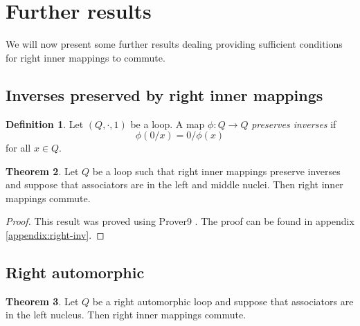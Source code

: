 \documentclass[12pt, twoside, openright]{report}
\theoremstyle{definition}
\newtheorem{thm}{Theorem}[chapter]
\newtheorem{dfn}[thm]{Definition}
\newcommand{\rdv}{/}                %
\begin{document}
\section{Further results}

We will now present some further results dealing providing sufficient conditions for right
  inner mappings to commute.

\subsection{Inverses preserved by right inner mappings}

\begin{dfn}
  Let $(Q, \cdot, 1)$ be a loop. A map $\phi: Q\to Q$ \emph{preserves inverses} if
  \[\phi(0\rdv x) = 0\rdv \phi(x)\]
  for all $x\in Q$.
\end{dfn}

\begin{thm}\label{thm:right-inv}
  Let $Q$ be a loop such that right inner mappings preserve inverses and suppose that
    associators are in the left and middle nuclei. Then right inner mappings commute.
\end{thm}

\begin{proof}
  This result was proved using Prover9 \cite{Prover9}. The proof can be found in
    appendix \ref{appendix:right-inv}.
\end{proof}

\subsection{Right automorphic}

\begin{thm}\label{right-aut}
  Let $Q$ be a right automorphic loop and suppose that associators are in the left nucleus.
    Then right inner mappings commute.
\end{thm}
\end{document}

